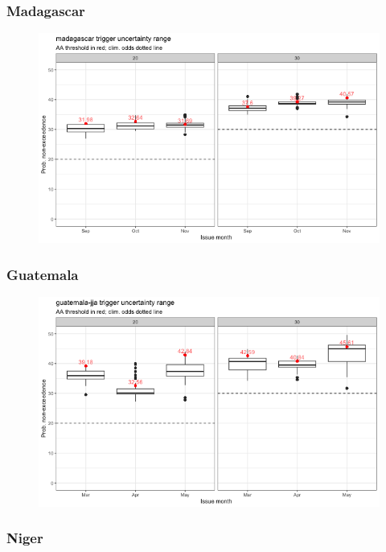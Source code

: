 \documentclass{ametsocV5}
\begin{document}
\subsubsection{Madagascar}

\begin{figure}
    \centering
    \includegraphics[width=0.9\linewidth]{figures/madagascar.png}
\end{figure}

\subsubsection{Guatemala}

\begin{figure}
    \centering
    \includegraphics[width=0.9\linewidth]{figures/guatemala-jja.png}
\end{figure}

\subsubsection{Niger}
\end{document}
